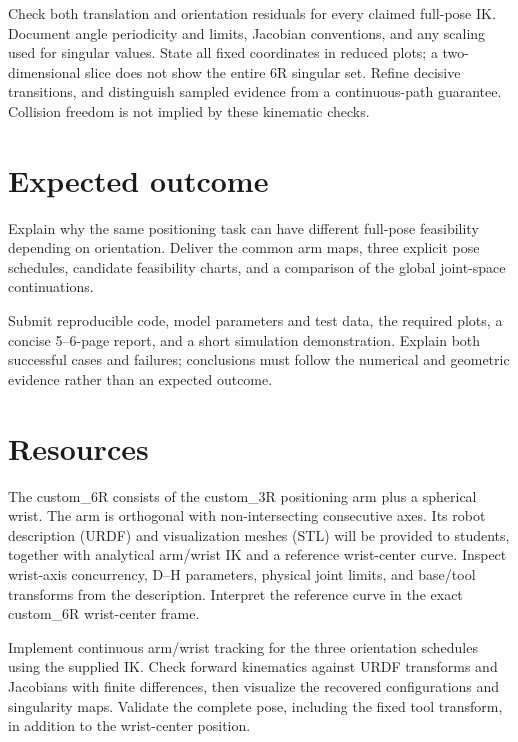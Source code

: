 \documentclass[11pt,a4paper]{article}
\begin{document}
Check both translation and orientation residuals
for every claimed full-pose IK. Document angle periodicity and limits,
Jacobian conventions, and any scaling used for singular values. State all
fixed coordinates in reduced plots; a two-dimensional slice does not show
the entire 6R singular set. Refine decisive transitions, and distinguish
sampled evidence from a continuous-path guarantee. Collision freedom is
not implied by these kinematic checks.

\section*{Expected outcome}
Explain why the same positioning task can have different full-pose
feasibility depending on orientation. Deliver the common arm maps, three
explicit pose schedules, candidate feasibility charts, and a comparison of
the global joint-space continuations.

Submit reproducible code, model parameters and test data, the required plots,
a concise 5--6-page report, and a short simulation demonstration. Explain
both successful cases and failures; conclusions must follow the numerical
and geometric evidence rather than an expected outcome.

\section*{Resources}
The custom\_6R consists of the custom\_3R positioning arm plus a
spherical wrist. The arm is orthogonal with non-intersecting consecutive axes.
Its robot description (URDF) and visualization meshes (STL) will be provided
to students, together with analytical arm/wrist IK and a reference
wrist-center curve. Inspect wrist-axis concurrency, D--H parameters, physical
joint limits, and base/tool transforms from the description. Interpret the
reference curve in the exact custom\_6R wrist-center frame.

Implement continuous arm/wrist tracking for the three orientation schedules
using the supplied IK. Check forward kinematics against URDF transforms and
Jacobians with finite differences, then visualize the recovered configurations
and singularity maps. Validate the complete pose, including the fixed tool
transform, in addition to the wrist-center position.
\end{document}
